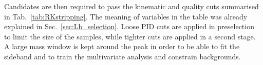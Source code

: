 Candidates are then required to pass the kinematic and quality cuts summarised in Tab.~\ref{tab:RKstripping}. 
The meaning of variables in the table was already explained in Sec.~\ref{sec:Lb_selection}.
Loose PID cuts are applied in preselection to limit the size of the samples, while tighter cuts are applied
in a second stage. A large mass window is kept around the \Bz peak in order to be able
to fit the sideband and to train the multivariate analysis and constrain backgrounds.
%
%
